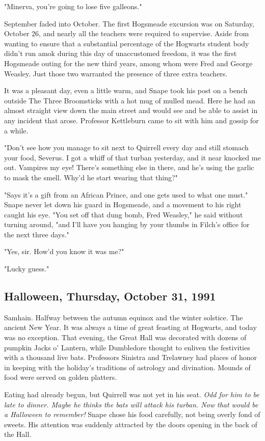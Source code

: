 "Minerva, you're going to lose five galleons."

September faded into October. The first Hogsmeade excursion was on Saturday, October 26, and nearly all the teachers were required to supervise. Aside from wanting to ensure that a substantial percentage of the Hogwarts student body didn't run amok during this day of unaccustomed freedom, it was the first Hogsmeade outing for the new third years, among whom were Fred and George Weasley. Just those two warranted the presence of three extra teachers.

It was a pleasant day, even a little warm, and Snape took his post on a bench outside The Three Broomsticks with a hot mug of mulled mead. Here he had an almost straight view down the main street and would see and be able to assist in any incident that arose. Professor Kettleburn came to sit with him and gossip for a while.

"Don't see how you manage to sit next to Quirrell every day and still stomach your food, Severus. I got a whiff of that turban yesterday, and it near knocked me out. Vampires my eye! There's something else in there, and he's using the garlic to mask the smell. Why'd he start wearing that thing?"

"Says it's a gift from an African Prince, and one gets used to what one must." Snape never let down his guard in Hogsmeade, and a movement to his right caught his eye. "You set off that dung bomb, Fred Weasley," he said without turning around, "and I'll have you hanging by your thumbs in Filch's office for the next three days."

"Yes, sir. How'd you know it was me?"

"Lucky guess."

\subsection{Halloween, Thursday, October 31, 1991}

Samhain. Halfway between the autumn equinox and the winter solstice. The ancient New Year. It was always a time of great feasting at Hogwarts, and today was no exception. That evening, the Great Hall was decorated with dozens of pumpkin Jacks o' Lantern, while Dumbledore thought to enliven the festivities with a thousand live bats. Professors Sinistra and Trelawney had places of honor in keeping with the holiday's traditions of astrology and divination. Mounds of food were served on golden platters.

Eating had already begun, but Quirrell was not yet in his seat. \emph{Odd for him to be late to dinner. Maybe he thinks the bats will attack his turban. Now that would be a Halloween to remember!} Snape chose his food carefully, not being overly fond of sweets. His attention was suddenly attracted by the doors opening in the back of the Hall.

